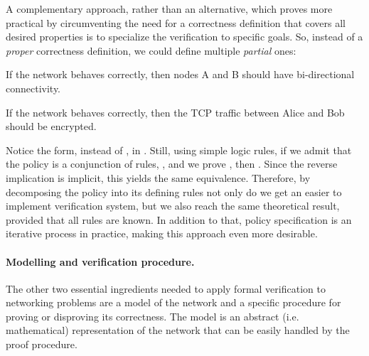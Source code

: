 A complementary approach, rather than an alternative, which proves more
practical by circumventing the need for a correctness definition that covers
all desired properties is to specialize the verification to specific goals.
So, instead of a \emph{proper} correctness definition, we could define multiple
\emph{partial} ones:

\begin{definition}
If the network behaves correctly, then nodes A and B should have bi-directional
connectivity.
\end{definition}

\begin{definition}
If the network behaves correctly, then the TCP traffic between Alice and Bob
should be encrypted.
\end{definition}

Notice the  form, instead of
, in
.  Still, using simple logic
rules, if we admit that the policy is a conjunction of rules,
, and we prove
, then
.  Since the reverse implication is implicit,
this yields the same equivalence.  Therefore, by decomposing the policy into
its defining rules not only do we get an easier to implement verification
system, but we also reach the same theoretical result, provided that all rules
are known.  In addition to that, policy specification is an iterative process
in practice, making this approach even more desirable.

\paragraph{Modelling and verification procedure.}
The other two essential ingredients needed to apply formal verification to
networking problems are a model of the network and a specific procedure for
proving or disproving its correctness.  The model is an abstract (i.e.
mathematical) representation of the network that can be easily handled by the
proof procedure.

